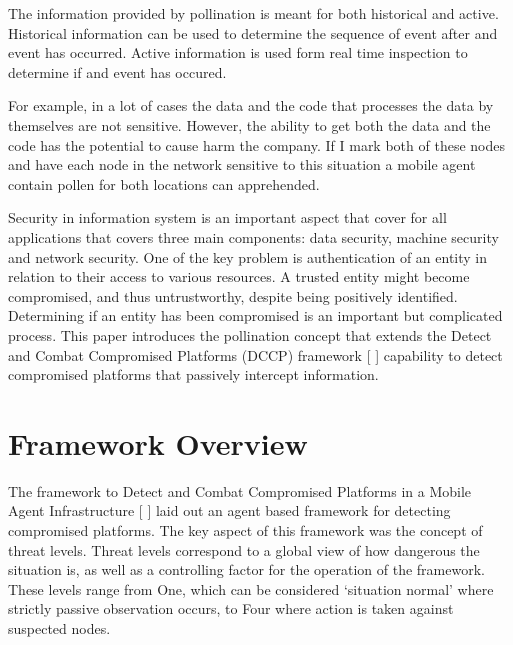\documentclass{acm_proc_article-sp}
\begin{document}
The information provided by pollination is meant for both historical and active. Historical information can be used to determine the sequence of event after and event has occurred. Active information is used form real time inspection to determine if and event has occured.

For example, in a lot of cases the data and the code that processes the data by themselves are not sensitive. However, the ability to get both the data and the code has the potential to cause harm the company. If I mark both of these nodes and have each node in the network sensitive to this situation a mobile agent contain pollen for both locations can apprehended.

Security in information system is an important aspect that cover for all applications that covers three main components: data security, machine security and network security. One of the key problem is authentication of an entity in relation to their access to various resources. A trusted entity might become compromised, and thus untrustworthy, despite being positively identified.  Determining if an entity has been compromised is an important but complicated process. This paper introduces the pollination concept that extends the Detect and Combat Compromised Platforms (DCCP) framework [ ] capability to detect compromised platforms that passively intercept information.

\section{Framework Overview}
The framework to Detect and Combat Compromised Platforms in a Mobile Agent Infrastructure [ ] laid out an agent based framework for detecting compromised platforms.  The key aspect of this framework was the concept of threat levels.  Threat levels correspond to a global view of how dangerous the situation is, as well as a controlling factor for the operation of the framework.  These levels range from One, which can be considered ‘situation normal’ where strictly passive observation occurs, to Four where action is taken against suspected nodes.  
\end{document}

